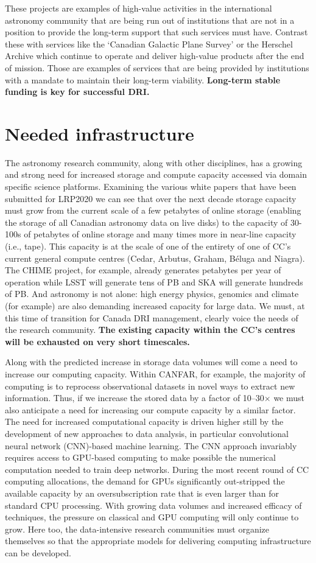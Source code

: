 \documentclass[11pt]{article}
\begin{document}
These projects are examples of high-value activities in the international astronomy community that are being run out of institutions that are not in a position to provide the long-term support that such services must have.  
Contrast these with services like the `Canadian Galactic Plane Survey' or the Herschel Archive which continue to operate and deliver high-value products after the end of mission.  
Those are examples of services that are being provided by institutions with a mandate to maintain their long-term viability. 
{\bf Long-term stable funding is key for successful DRI.}

\section{Needed infrastructure}
The astronomy research community, along with other disciplines,  has a growing and strong need for increased storage and compute capacity accessed via domain specific science platforms.
Examining the various white papers that have been submitted for LRP2020 we can see that over the next decade storage capacity must grow from the current scale of a few petabytes of online storage (enabling the storage of all Canadian astronomy data on live disks) to the capacity of 30-100s of petabytes of online storage and many times more in near-line capacity (i.e., tape). 
This capacity is at the scale of one of the entirety of one of CC's current general compute centres (Cedar, Arbutus, Graham, Béluga and Niagra). 
The CHIME project, for example, already generates petabytes per year of operation while LSST will generate tens of PB and SKA will generate hundreds of PB.  
And astronomy is not alone:  high energy physics, genomics and climate (for example) are also demanding increased capacity for large data.  
We must, at this time of transition for Canada DRI management, clearly voice the needs of the research community.
{\bf The existing capacity within the CC's centres will be exhausted on very short timescales.}

Along with the predicted increase in storage data volumes will come a need to increase our computing capacity.  
Within CANFAR, for example, the majority of computing is to reprocess observational datasets in novel ways to extract new information.  
Thus, if we increase the stored data by a factor of 10--30$\times$ we must also anticipate a need for increasing our compute capacity by a similar factor.  
The need for increased computational capacity is driven higher still by the development of new approaches to data analysis, in particular convolutional neural network (CNN)-based machine learning.  
The CNN approach invariably requires access to GPU-based computing to make possible the numerical computation needed to train deep networks. 
During the most recent round of CC computing allocations, the demand for GPUs significantly out-stripped the available capacity by an oversubscription rate that is even larger than for standard CPU processing. 
With growing data volumes and increased efficacy of techniques, the pressure on classical and GPU computing will only continue to grow.  
Here too, the data-intensive research communities must organize themselves so that the appropriate models for delivering computing infrastructure can be developed.
\end{document}
